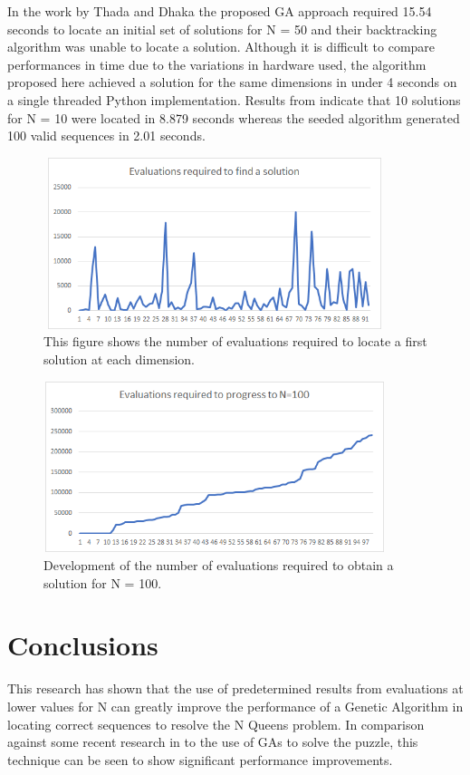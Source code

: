 \documentclass[a4paper,onecolumn,11pt]{article}
\begin{document}
In the work by Thada and Dhaka \cite{Performance} the proposed GA approach required 15.54 seconds to locate an initial set of solutions for N = 50 and their backtracking algorithm was unable to locate a solution. Although it is difficult to compare performances in time due to the variations in hardware used, the algorithm proposed here achieved a solution for the same dimensions in under 4 seconds on a single threaded Python implementation. Results from \cite{Performance} indicate that 10 solutions for N = 10 were located in 8.879 seconds whereas the seeded algorithm generated 100 valid sequences in 2.01 seconds.

\begin{figure}[!htbp]
	\centering	
	\includegraphics[width=10cm, height=5cm]{EvaluationsPerDimension}
	\caption{This figure shows the number of evaluations required to locate a first solution at each dimension.}
\end{figure}

\begin{figure}[!htbp]
	\centering	
	\includegraphics[width=10cm, height=5cm]{EvaluationProgress}
	\caption{Development of the number of evaluations required to obtain a solution for N = 100.}
\end{figure}

\section{Conclusions}
This research has shown that the use of predetermined results from evaluations at lower values for N can greatly improve the performance of a Genetic Algorithm in locating correct sequences to resolve the N Queens problem. In comparison against some recent research in to the use of GAs to solve the puzzle, this technique can be seen to show significant performance improvements. 
\end{document}
